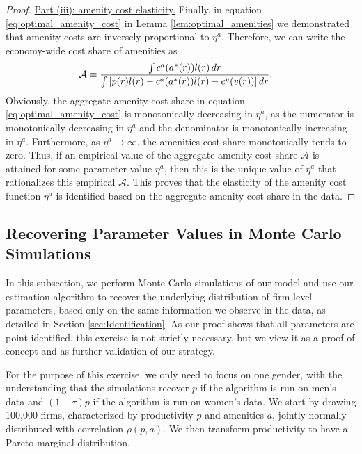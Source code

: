 \begin{proof}
    \uline{Part (iii): amenity cost elasticity.} %
    Finally, in equation \eqref{eq:optimal_amenity_cost} in Lemma \ref{lem:optimal_amenities} we demonstrated that amenity costs are inversely proportional to $\eta^{a}$.
    Therefore, we can write the economy-wide cost share of amenities as
    \begin{align}
        \mathcal{A} &\equiv \frac{ \int c^{a}(a^{\ast}(r))l(r) \mathop{}\!{d} r }{ \int \left[ p(r)l(r) - c^{a}(a^{\ast}(r))l(r) - c^{v}(v(r)) \right] \mathop{}\!{d} r }.
    \end{align}
    Obviously, the aggregate amenity cost share in equation \eqref{eq:optimal_amenity_cost} is monotonically decreasing in $\eta^{a}$, as the numerator is monotonically decreasing in $\eta^{a}$ and the denominator is monotonically increasing in $\eta^{a}$. Furthermore, as $\eta^{a} \rightarrow \infty$, the amenities cost share monotonically tends to zero. Thus, if an empirical value of the aggregate amenity cost share $\mathcal{A}$ is attained for some parameter value $\eta^{a}$, then this is the unique value of $\eta^{a}$ that rationalizes this empirical $\mathcal{A}$. This proves that the elasticity of the amenity cost function $\eta^{a}$ is identified based on the aggregate amenity cost share in the data.
\end{proof}


\subsection{Recovering Parameter Values in Monte Carlo Simulations\label{app:appendix_montecarlo}}

In this subsection, we perform Monte Carlo simulations of our model and use our estimation algorithm to recover the underlying distribution of firm-level parameters, based only on the same information we observe in the data, as detailed in Section \ref{sec:Identification}. As our proof shows that all parameters are point-identified, this exercise is not strictly necessary, but we view it as a proof of concept and as further validation of our strategy.

For the purpose of this exercise, we only need to focus on one gender, with the understanding that the simulations recover $p$ if the algorithm is run on men's data and $(1 - \tau) p$ if the algorithm is run on women's data. We start by drawing 100,000 firms, characterized by productivity $p$ and amenities $a$, jointly normally distributed with correlation $\rho(p,a)$. We then transform productivity to have a Pareto marginal distribution.

